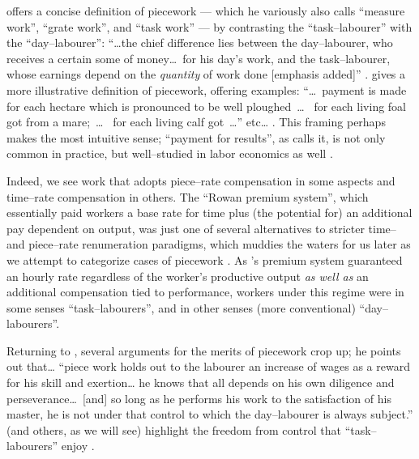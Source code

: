 \documentclass[trackingWork]{subfiles}
\begin{document}
\citeauthor{hughRaynbirdTaskWork} offers
a concise definition of piecework
--- which he variously also calls ``measure work'', ``grate work'', and ``task work'' ---
by contrasting the ``task--labourer'' with the ``day--labourer'':
``\dots the chief difference lies between the day--labourer,
who receives a certain some of money\dots~for his day's work,
and the task--labourer, whose earnings depend on the \textit{quantity} of work done [emphasis added]''
\cite{hughRaynbirdTaskWork}.
\citeauthor{10.2307/2338394} gives a more illustrative definition of piecework,
offering examples:
``\dots~payment is made for each hectare which is pronounced to be well ploughed~\dots~
for each living foal got from a mare;~\dots~
for each living calf got~\dots'' etc\dots
\cite{10.2307/2338394}.
This framing perhaps makes the most intuitive sense;
``payment for results'', as \citeauthor{10.2307/2338394} calls it,
is not only common in practice, but well--studied in labor economics as well
\cite{Figlio2007901,weitzman1976new,10.2307/3003414,BJIR:BJIR038}.

Indeed, we see work that adopts
piece--rate compensation in some aspects and
time--rate compensation in others.
The ``Rowan premium system'',
which essentially paid workers
a base rate for time plus
(the potential for) an additional pay dependent on output,
was just one of several alternatives to stricter time-- and piece--rate renumeration paradigms, which
muddies the waters for us later as we attempt to categorize cases of piecework
\cite{rowan1901premium}.
As \citeauthor{rowan1901premium}'s premium system guaranteed an hourly rate
regardless of the worker's productive output
\textit{as well as} an additional compensation tied to performance,
workers under this regime were in some senses ``task--labourers'',
and in other senses
(more conventional)
``day--labourers''.

Returning to
\citeauthor{hughRaynbirdTaskWork}, several arguments for the merits of piecework
crop up; he points out that\dots
``piece work holds out to the labourer an increase of wages as a reward for his skill and exertion\dots
he knows that all depends on his own diligence and perseverance\dots~[and]
so long as he performs his work to the satisfaction of his master,
he is not under that control to which the day--labourer is always subject.''
\citeauthor{hughRaynbirdTaskWork} (and others, as we will see)
highlight the freedom from control that ``task--labourers'' enjoy
\cite{hughRaynbirdTaskWork,rowan1901premium}.
\end{document}
